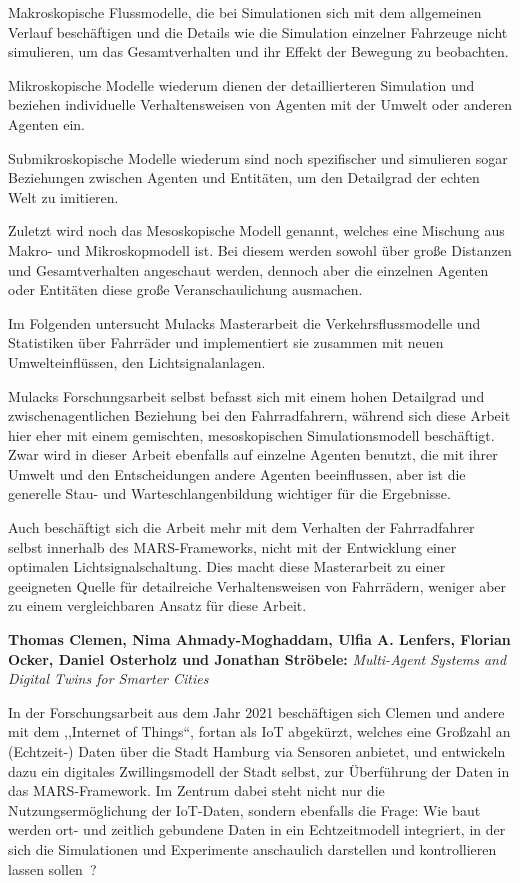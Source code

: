 Makroskopische Flussmodelle, die bei Simulationen sich mit dem allgemeinen Verlauf beschäftigen und die Details wie die Simulation einzelner Fahrzeuge nicht simulieren, um das Gesamtverhalten und ihr Effekt der Bewegung zu beobachten\cite{Mulack2020}.

Mikroskopische Modelle wiederum dienen der detaillierteren Simulation und beziehen individuelle Verhaltensweisen von Agenten mit der Umwelt oder anderen Agenten ein\cite{Mulack2020}.

Submikroskopische Modelle wiederum sind noch spezifischer und simulieren sogar Beziehungen zwischen Agenten und Entitäten, um den Detailgrad der echten Welt zu imitieren\cite{Mulack2020}.

Zuletzt wird noch das Mesoskopische Modell genannt, welches eine Mischung aus Makro- und Mikroskopmodell ist.
Bei diesem werden sowohl über große Distanzen und Gesamtverhalten angeschaut werden, dennoch aber die einzelnen Agenten oder Entitäten diese große Veranschaulichung ausmachen\cite{Mulack2020}.

Im Folgenden untersucht Mulacks Masterarbeit die Verkehrsflussmodelle und Statistiken über Fahrräder und implementiert sie zusammen mit neuen Umwelteinflüssen, den Lichtsignalanlagen.

Mulacks Forschungsarbeit selbst befasst sich mit einem hohen Detailgrad und zwischenagentlichen Beziehung bei den Fahrradfahrern, während sich diese Arbeit hier eher mit einem gemischten, mesoskopischen Simulationsmodell beschäftigt.
Zwar wird in dieser Arbeit ebenfalls auf einzelne Agenten benutzt, die mit ihrer Umwelt und den Entscheidungen andere Agenten beeinflussen, aber ist die generelle Stau- und Warteschlangenbildung wichtiger für die Ergebnisse.

Auch beschäftigt sich die Arbeit mehr mit dem Verhalten der Fahrradfahrer selbst innerhalb des MARS-Frameworks, nicht mit der Entwicklung einer optimalen Lichtsignalschaltung.
Dies macht diese Masterarbeit zu einer geeigneten Quelle für detailreiche Verhaltensweisen von Fahrrädern, weniger aber zu einem vergleichbaren Ansatz für diese Arbeit.


\textbf{Thomas Clemen, Nima Ahmady-Moghaddam, Ulfia A. Lenfers, Florian Ocker, Daniel Osterholz und Jonathan Ströbele:}
\textit{Multi-Agent Systems and Digital Twins for Smarter Cities}

In der Forschungsarbeit aus dem Jahr 2021 beschäftigen sich Clemen und andere mit dem ,,Internet of Things``, fortan als IoT abgekürzt, welches eine Großzahl an (Echtzeit-) Daten über die Stadt Hamburg via Sensoren anbietet, und entwickeln dazu ein digitales Zwillingsmodell der Stadt selbst, zur Überführung der Daten in das MARS-Framework.
Im Zentrum dabei steht nicht nur die Nutzungsermöglichung der IoT-Daten, sondern ebenfalls die Frage: Wie baut werden ort- und zeitlich gebundene Daten in ein Echtzeitmodell integriert, in der sich die Simulationen und Experimente anschaulich darstellen und kontrollieren lassen sollen~\cite{Clemen2021}?

